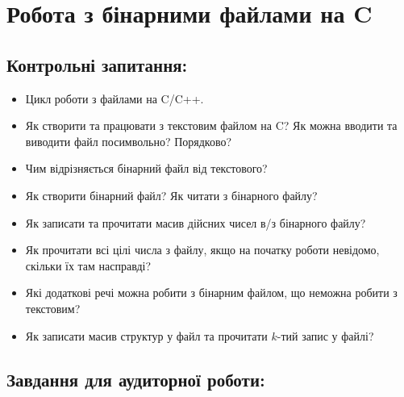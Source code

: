\documentclass[a5paper,titlepage,openany,twoside,draft]{book_unv}%
\begin{document}
\chapter{Робота з бінарними файлами на C}
%

\section{Контрольні запитання:}
\begin{itemize}
\item
  Цикл роботи з файлами на C/C++.
\item
  Як створити та працювати з текстовим файлом на C? Як можна вводити та
  виводити файл посимвольно? Порядково?
\item
  Чим відрізняється бінарний файл від текстового? 
\item 
  Як створити бінарний файл? Як читати з бінарного файлу?
\item
  Як записати та прочитати масив дійсних чисел в/з бінарного файлу?
\item
  Як прочитати всі цілі числа з файлу, якщо на початку роботи невідомо,
  скільки їх там насправді?
\item
  Які додаткові речі можна робити з бінарним файлом, що неможна робити з
  текстовим?
\item
  Як записати масив структур у файл та прочитати $k$-тий запис у файлі?
\end{itemize}

\section{Завдання для аудиторної роботи:}
\end{document}
